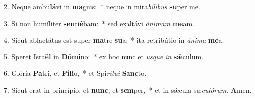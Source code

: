 2. Neque ambu\textbf{lá}vi in \textbf{ma}gnis:~*  neque in mira\textit{bí}\textit{li}\textit{bus} \textbf{su}per me.\

3. Si non humíliter \textbf{sen}ti\textbf{é}bam:~*  sed exaltávi \textit{á}\textit{ni}\textit{mam} \textbf{me}am.\

4. Sicut ablactátus est super \textbf{ma}tre \textbf{su}a:~*  ita retribútio in \textit{á}\textit{ni}\textit{ma} \textbf{me}a.\

5. Speret Isra\textbf{ël} in \textbf{Dó}\textbf{mi}no:~*  ex hoc nunc et \textit{us}\textit{que} \textit{in} \textbf{sǽ}culum.\

6. Glória \textbf{Pa}tri, et \textbf{Fí}\textbf{li}o,~*  et Spi\textit{rí}\textit{tu}\textit{i} \textbf{Sanc}to.\

7. Sicut erat in princípio, et \textbf{nunc}, et \textbf{sem}per,~*  et in sǽcula sæ\textit{cu}\textit{ló}\textit{rum}. \textbf{A}men.\

